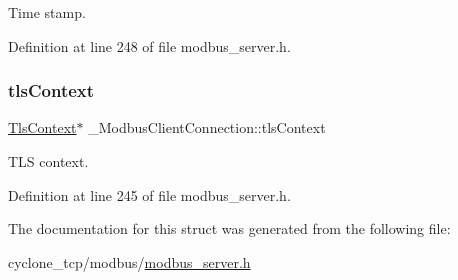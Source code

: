Time stamp. 



Definition at line 248 of file modbus\+\_\+server.\+h.

\mbox{\label{struct__ModbusClientConnection_a39d29258838f9f77d4c05ec9dab225c5}} 
\subsubsection{\texorpdfstring{tls\+Context}{tlsContext}}
{\footnotesize\ttfamily \hyperlink{tls_8h_ac09f7a286c0cdf9b07ee1edd107946f5}{Tls\+Context}$\ast$ \+\_\+\+Modbus\+Client\+Connection\+::tls\+Context}



T\+LS context. 



Definition at line 245 of file modbus\+\_\+server.\+h.



The documentation for this struct was generated from the following file\+:\begin{DoxyCompactItemize}
\item 
cyclone\+\_\+tcp/modbus/\hyperlink{modbus__server_8h}{modbus\+\_\+server.\+h}\end{DoxyCompactItemize}
